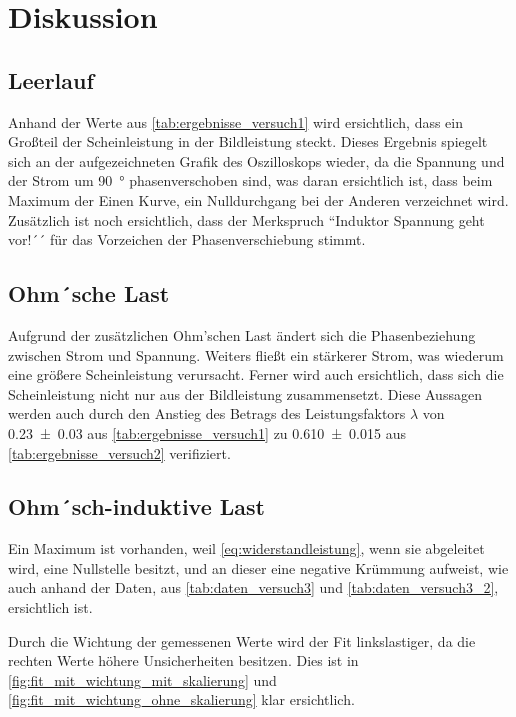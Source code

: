 \documentclass[11pt,ngerman]{scrartcl}
\begin{document}
\section{Diskussion}\label{disk}


\subsection{Leerlauf}

Anhand der Werte aus \autoref{tab:ergebnisse_versuch1} wird ersichtlich,
dass ein Großteil der Scheinleistung in der Bildleistung steckt. Dieses
Ergebnis spiegelt sich an der aufgezeichneten Grafik des Oszilloskops wieder,
da die Spannung und der Strom um \SI{90}{\degree} phasenverschoben sind, was
daran ersichtlich ist, dass beim Maximum der Einen Kurve, ein Nulldurchgang bei
der Anderen verzeichnet wird. Zusätzlich ist noch ersichtlich, dass der Merkspruch
``Induktor Spannung geht vor!´´ für das Vorzeichen der Phasenverschiebung
stimmt.


\subsection{Ohm´sche Last}

Aufgrund der zusätzlichen Ohm'schen Last ändert sich die Phasenbeziehung
zwischen Strom und Spannung. Weiters fließt ein stärkerer Strom, was wiederum
eine größere Scheinleistung verursacht. Ferner wird auch ersichtlich, dass sich
die Scheinleistung nicht nur aus der Bildleistung zusammensetzt. Diese Aussagen
werden auch durch den Anstieg des Betrags des Leistungsfaktors $\lambda$ von
\num{0.23(3)} aus \autoref{tab:ergebnisse_versuch1} zu \num{0.610(15)} aus
\autoref{tab:ergebnisse_versuch2} verifiziert.


\subsection{Ohm´sch-induktive Last}

Ein Maximum ist vorhanden, weil \autoref{eq:widerstandleistung}, wenn sie
abgeleitet wird, eine Nullstelle besitzt, und an dieser eine negative Krümmung
aufweist, wie auch anhand der Daten, aus \autoref{tab:daten_versuch3} und
\autoref{tab:daten_versuch3_2}, ersichtlich ist.

Durch die Wichtung der gemessenen Werte wird der Fit linkslastiger, da die
rechten Werte höhere Unsicherheiten besitzen. Dies ist in
\autoref{fig:fit_mit_wichtung_mit_skalierung} und
\autoref{fig:fit_mit_wichtung_ohne_skalierung} klar ersichtlich.
\end{document}

